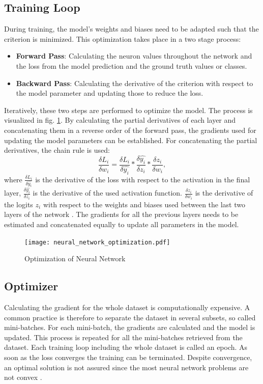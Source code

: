 \subsection{Training Loop}
During training, the model's weights and biases need to be adapted such that the criterion is minimized. This optimization takes place in a two stage process:
\begin{itemize}
    \item \textbf{Forward Pass}: Calculating the neuron values throughout the network and the loss from the model prediction and the ground truth values or classes.
    \item \textbf{Backward Pass}: Calculating the derivative of the criterion with respect to the model parameter and updating those to reduce the loss.
\end{itemize}
Iteratively, these two steps are performed to optimize the model. The process is visualized in fig. \ref{fig:neural_network_optimization}. By calculating the partial derivatives of each layer and concatenating them in a reverse order of the forward pass, the gradients used for updating the model parameters can be established. For concatenating the partial derivatives, the chain rule is used:
\begin{equation}
 \frac{\delta L_{i}}{\delta w_{i}} = \frac{\delta L_{i}}{\delta \hat{y_{i}}} * \frac{\delta \hat{y_{i}}}{\delta z_{i}} * \frac{\delta z_{i}}{\delta w_{i}}, 
 \label{chain_rule}
\end{equation}
where $\frac{\delta L_{i}}{\delta \hat{y_{i}}}$ is the derivative of the loss with respect to the activation in the final layer, $\frac{\delta \hat{y_{i}}}{\delta z_{i}}$ is the derivative of the used activation function.  $\frac{\delta z_{i}}{\delta w_{i}}$ is the derivative of the logits $z_{i}$ with respect to the weights and biases used between the last two layers of the network \cite{ShilohPerl2020}. The gradients for all the previous layers needs to be estimated and concatenated equally to update all parameters in the model.

\begin{figure}[H]
  \centering
  \texttt{[image: neural\_network\_optimization.pdf]}
  \caption {Optimization of Neural Network}
  \label{fig:neural_network_optimization}
\end{figure}

\subsection{Optimizer}
Calculating the gradient for the whole dataset is computationally expensive. A common practice is therefore to separate the dataset in several subsets, so called mini-batches. For each mini-batch, the gradients are calculated and the model is updated. This process is repeated for all the mini-batches retrieved from the dataset. Each training loop including the whole dataset is called an epoch. As soon as the loss converges the training can be terminated. Despite convergence, an optimal solution is not assured since the most neural network problems are not convex \cite{ShilohPerl2020}.

